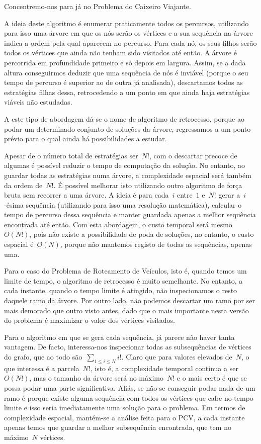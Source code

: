 \documentclass[12pt,a4paper,reqno]{report}
\numberwithin{figure}{section}
\numberwithin{equation}{section}
\begin{document}
Concentremo-nos para já no Problema do Caixeiro Viajante.

A ideia deste algoritmo é enumerar praticamente todos os percursos, utilizando para isso uma árvore em que os nós serão os vértices e a sua sequência na árvore indica a ordem pela qual aparecem no percurso. Para cada nó, os seus filhos serão todos os vértices que ainda não tenham sido visitados até então. A árvore é percorrida em profundidade primeiro e só depois em largura. Assim, se a dada altura conseguirmos deduzir que uma sequência de nós é inviável (porque o seu tempo de percurso é superior ao de outra já analisada), descartamos todos as estratégias filhas dessa, retrocedendo a um ponto em que ainda haja estratégias viáveis não estudadas.

A este tipo de abordagem dá-se o nome de algoritmo de retrocesso, porque ao podar um determinado conjunto de soluções da árvore, regressamos a um ponto prévio para o qual ainda há possibilidades a estudar.

Apesar de o número total de estratégias ser~$N!$, com o descartar precoce de algumas é possível reduzir o tempo de computação da solução. No entanto, ao guardar todas as estratégias numa árvore, a complexidade espacial será também da ordem de~$N!$. É possível melhorar isto utilizando outro algoritmo de força bruta sem recorrer a uma árvore. A ideia é para cada~$i$ entre~$1$ e~$N!$ gerar a~$i$-ésima sequência (utilizando para isso uma resolução matemática), calcular o tempo de percurso dessa sequência e manter guardada apenas a melhor sequência encontrada até então. Com esta abordagem, o custo temporal será mesmo~$O(N!)$, pois não existe a possibilidade de poda de soluções, no entanto, o custo espacial é~$O(N)$, porque não mantemos registo de todas as sequências, apenas uma.

Para o caso do Problema de Roteamento de Veículos, isto é, quando temos um limite de tempo, o algoritmo de retrocesso é muito semelhante. No entanto, a cada instante, quando o tempo limite é atingido, não inspecionamos o resto daquele ramo da árvore. Por outro lado, não podemos descartar um ramo por ser mais demorado que outro visto antes, dado que o mais importante nesta versão do problema é maximizar o valor dos vértices visitados.

Para o algoritmo em que se gera cada sequência, já parece não haver tanta vantagem. De facto, interessa-nos inspecionar todas as subsequências de vértices do grafo, que ao todo são~$\sum_{1 \leq i \leq N} i!$. Claro que para valores elevados de~$N$, o que interessa é a parcela~$N!$, isto é, a complexidade temporal continua a ser~$O(N!)$, mas o tamanho da árvore será no máximo~$N!$ e o mais certo é que se possa podar uma parte significativa. Aliás, se não se conseguir podar nada de um ramo é porque existe alguma sequência com todos os vértices que cabe no tempo limite e isso seria imediatamente uma solução para o problema. Em termos de complexidade espacial, mantém-se a análise feita para o PCV, a cada instante apenas temos que guardar a melhor subsequência encontrada, que tem no máximo~$N$ vértices.
\end{document}
